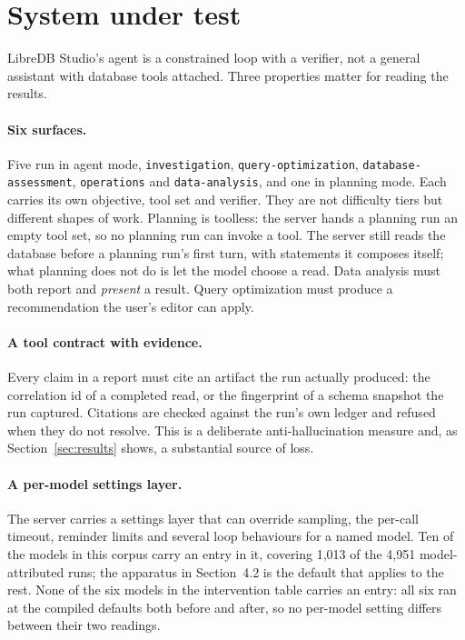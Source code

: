 \documentclass[11pt]{article}
\newcommand{\code}[1]{\texttt{\small #1}}
\begin{document}
\section{System under test}

LibreDB Studio's agent is a constrained loop with a verifier, not a general assistant with database tools
attached. Three properties matter for reading the results.

\paragraph{Six surfaces.} Five run in agent mode, \code{investigation}, \code{query-optimization},
\code{database-assessment}, \code{operations} and \code{data-analysis}, and one in planning mode. Each carries
its own objective, tool set and verifier. They are not difficulty tiers but different shapes of work. Planning is
toolless: the server hands a planning run an empty tool set, so no planning run can invoke a tool. The server
still reads the database before a planning run's first turn, with statements it composes itself; what planning
does not do is let the model choose a read. Data analysis must both report and \emph{present} a result. Query optimization must
produce a recommendation the user's editor can apply.

\paragraph{A tool contract with evidence.} Every claim in a report must cite an artifact the run actually
produced: the correlation id of a completed read, or the fingerprint of a schema snapshot the run captured.
Citations are checked against the run's own ledger and refused when they do not resolve. This is a deliberate
anti-hallucination measure and, as Section~\ref{sec:results} shows, a substantial source of loss.

\paragraph{A per-model settings layer.}
The server carries a settings layer that can override sampling, the per-call timeout, reminder limits and several
loop behaviours for a named model. Ten of the models in this corpus carry an entry in it, covering 1{,}013 of the
4{,}951 model-attributed runs; the apparatus in Section~4.2 is the default that applies to the rest. None of the
six models in the intervention table carries an entry: all six ran at the compiled defaults both before and
after, so no per-model setting differs between their two readings.
\end{document}
